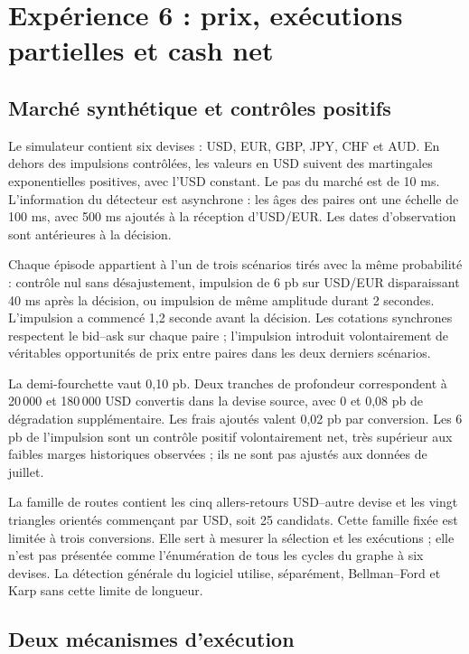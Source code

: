 \clearpage
\section{Expérience 6 : prix, exécutions partielles et cash net}
\label{sec:ext-exp-six}

\subsection{Marché synthétique et contrôles positifs}

Le simulateur contient six devises : USD, EUR, GBP, JPY, CHF et AUD. En dehors des impulsions contrôlées, les valeurs en USD suivent des martingales exponentielles positives, avec l'USD constant. Le pas du marché est de 10 ms. L'information du détecteur est asynchrone : les âges des paires ont une échelle de 100 ms, avec 500 ms ajoutés à la réception d'USD/EUR. Les dates d'observation sont antérieures à la décision.

Chaque épisode appartient à l'un de trois scénarios tirés avec la même probabilité : contrôle nul sans désajustement, impulsion de 6 pb sur USD/EUR disparaissant 40 ms après la décision, ou impulsion de même amplitude durant 2 secondes. L'impulsion a commencé 1,2 seconde avant la décision. Les cotations synchrones respectent le bid--ask sur chaque paire ; l'impulsion introduit volontairement de véritables opportunités de prix entre paires dans les deux derniers scénarios.

La demi-fourchette vaut 0,10 pb. Deux tranches de profondeur correspondent à 20\,000 et 180\,000 USD convertis dans la devise source, avec 0 et 0,08 pb de dégradation supplémentaire. Les frais ajoutés valent 0,02 pb par conversion. Les 6 pb de l'impulsion sont un contrôle positif volontairement net, très supérieur aux faibles marges historiques observées ; ils ne sont pas ajustés aux données de juillet.

La famille de routes contient les cinq allers-retours USD--autre devise et les vingt triangles orientés commençant par USD, soit 25 candidats. Cette famille fixée est limitée à trois conversions. Elle sert à mesurer la sélection et les exécutions ; elle n'est pas présentée comme l'énumération de tous les cycles du graphe à six devises. La détection générale du logiciel utilise, séparément, Bellman--Ford et Karp sans cette limite de longueur.

\subsection{Deux mécanismes d'exécution}

